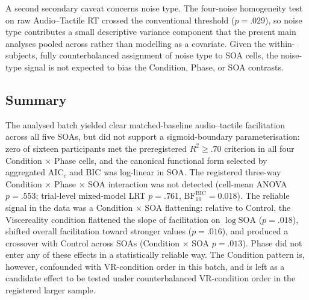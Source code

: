 A second secondary caveat concerns noise type. The four-noise homogeneity test on raw Audio--Tactile RT crossed the conventional threshold ($p = .029$), so noise type contributes a small descriptive variance component that the present main analyses pooled across rather than modelling as a covariate. Given the within-subjects, fully counterbalanced assignment of noise type to SOA cells, the noise-type signal is not expected to bias the Condition, Phase, or SOA contrasts.

\subsection{Summary}

The analysed batch yielded clear matched-baseline audio--tactile facilitation across all five SOAs, but did not support a sigmoid-boundary parameterisation: zero of sixteen participants met the preregistered $R^{2} \geq .70$ criterion in all four Condition $\times$ Phase cells, and the canonical functional form selected by aggregated $\mathrm{AIC}_{c}$ and BIC was log-linear in SOA. The registered three-way Condition $\times$ Phase $\times$ SOA interaction was not detected (cell-mean ANOVA $p = .553$; trial-level mixed-model LRT $p = .761$, $\mathrm{BF}_{10}^{\mathrm{BIC}} = 0.018$). The reliable signal in the data was a Condition $\times$ SOA flattening: relative to Control, the Viscereality condition flattened the slope of facilitation on $\log\mathrm{SOA}$ ($p = .018$), shifted overall facilitation toward stronger values ($p = .016$), and produced a crossover with Control across SOAs (Condition $\times$ SOA $p = .013$). Phase did not enter any of these effects in a statistically reliable way. The Condition pattern is, however, confounded with VR-condition order in this batch, and is left as a candidate effect to be tested under counterbalanced VR-condition order in the registered larger sample.
